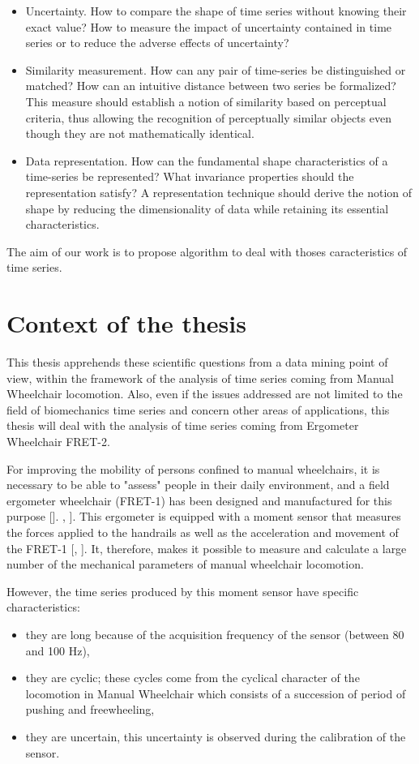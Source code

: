 \begin{itemize}
\item Uncertainty. How to compare the shape of time series without knowing their exact value? How to measure the impact of uncertainty contained in time series or to reduce the adverse effects of uncertainty? 
\item Similarity measurement. How can any pair of time-series be distinguished or
matched? How can an intuitive distance between two series be formalized? This
measure should establish a notion of similarity based on perceptual criteria, thus
allowing the recognition of perceptually similar objects even though they are not
mathematically identical.  
\item Data representation. How can the fundamental shape characteristics of a time-series
be represented? What invariance properties should the representation satisfy? A
representation technique should derive the notion of shape by reducing the dimensionality
of data while retaining its essential characteristics.
\end{itemize}

The aim of our work is to propose algorithm to deal with thoses caracteristics of time series.

\section*{Context of the thesis}
This thesis apprehends these scientific questions from a data mining point of view, within the framework of the analysis of time series coming from Manual Wheelchair locomotion. Also, even if the issues addressed are not limited to the field of biomechanics time series and concern other areas of applications, this thesis will deal with the analysis of time series coming from Ergometer Wheelchair FRET-2.


For improving the mobility of persons confined to manual wheelchairs, it is necessary to be able to "assess" people in their daily environment, and a field ergometer wheelchair (FRET-1) has been designed and manufactured for this purpose []. , ]. This ergometer is equipped with a moment sensor that measures the forces applied to the handrails as well as the acceleration and movement of the FRET-1 [, ]. It, therefore, makes it possible to measure and calculate a large number of the mechanical parameters of manual wheelchair locomotion.


However, the time series produced by this moment sensor have specific characteristics: 
\begin{itemize}
\item they are long because of the acquisition frequency of the sensor (between 80 and 100 Hz),
\item they are cyclic; these cycles come from the cyclical character of the locomotion in Manual Wheelchair which consists of a succession of period of pushing and freewheeling,
\item they are uncertain, this uncertainty is observed during the calibration of the sensor.
\end{itemize}
  

